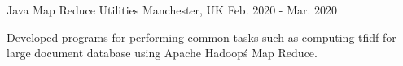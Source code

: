 \begin{cventries}


  


  \cventry
    {Java} %
    {Map Reduce Utilities} %
    {Manchester, UK} %
    {Feb. 2020 - Mar. 2020} %
    {
      \begin{cvitems} %
        \item {Developed programs for performing common tasks such as computing tfidf for large document database using Apache Hadoop\'s Map Reduce.}
      \end{cvitems}
    }
  


\end{cventries}
